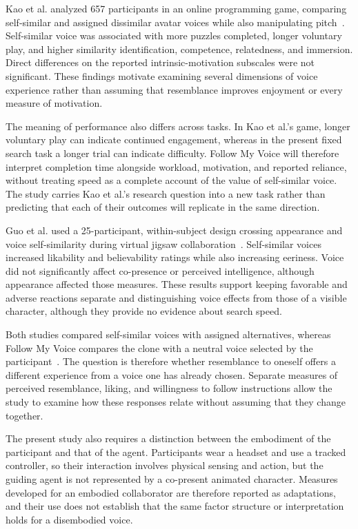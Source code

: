 Kao et al. analyzed 657 participants in an online programming game, comparing self-similar and assigned dissimilar avatar voices while also manipulating pitch~\cite{kao2021selfsimilar}. Self-similar voice was associated with more puzzles completed, longer voluntary play, and higher similarity identification, competence, relatedness, and immersion. Direct differences on the reported intrinsic-motivation subscales were not significant. These findings motivate examining several dimensions of voice experience rather than assuming that resemblance improves enjoyment or every measure of motivation.

The meaning of performance also differs across tasks. In Kao et al.'s game, longer voluntary play can indicate continued engagement, whereas in the present fixed search task a longer trial can indicate difficulty. Follow My Voice will therefore interpret completion time alongside workload, motivation, and reported reliance, without treating speed as a complete account of the value of self-similar voice. The study carries Kao et al.'s research question into a new task rather than predicting that each of their outcomes will replicate in the same direction.

Guo et al. used a 25-participant, within-subject design crossing appearance and voice self-similarity during virtual jigsaw collaboration~\cite{guo2024doppelganger}. Self-similar voices increased likability and believability ratings while also increasing eeriness. Voice did not significantly affect co-presence or perceived intelligence, although appearance affected those measures. These results support keeping favorable and adverse reactions separate and distinguishing voice effects from those of a visible character, although they provide no evidence about search speed.

Both studies compared self-similar voices with assigned alternatives, whereas Follow My Voice compares the clone with a neutral voice selected by the participant~\cite{kao2021selfsimilar,guo2024doppelganger}. The question is therefore whether resemblance to oneself offers a different experience from a voice one has already chosen. Separate measures of perceived resemblance, liking, and willingness to follow instructions allow the study to examine how these responses relate without assuming that they change together.

The present study also requires a distinction between the embodiment of the participant and that of the agent. Participants wear a headset and use a tracked controller, so their interaction involves physical sensing and action, but the guiding agent is not represented by a co-present animated character. Measures developed for an embodied collaborator are therefore reported as adaptations, and their use does not establish that the same factor structure or interpretation holds for a disembodied voice.

